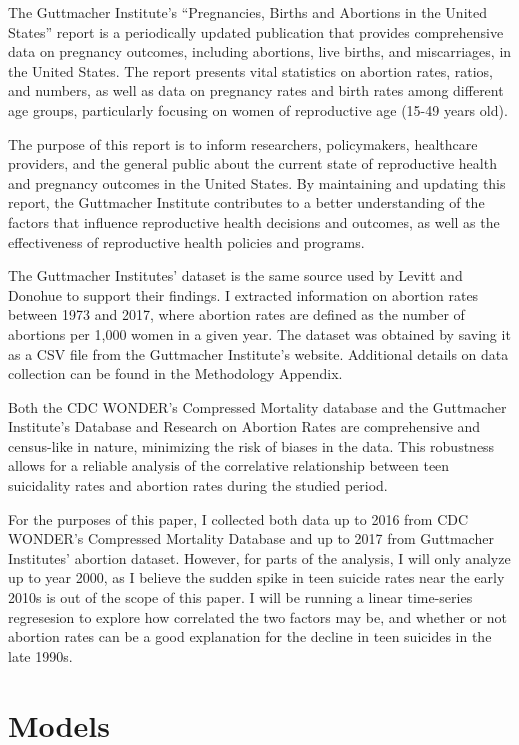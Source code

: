 \documentclass[
  letterpaper,
  DIV=11,
  numbers=noendperiod]{scrartcl}
\begin{document}
The Guttmacher Institute's ``Pregnancies, Births and Abortions in the
United States'' report is a periodically updated publication that
provides comprehensive data on pregnancy outcomes, including abortions,
live births, and miscarriages, in the United States. The report presents
vital statistics on abortion rates, ratios, and numbers, as well as data
on pregnancy rates and birth rates among different age groups,
particularly focusing on women of reproductive age (15-49 years old).

The purpose of this report is to inform researchers, policymakers,
healthcare providers, and the general public about the current state of
reproductive health and pregnancy outcomes in the United States. By
maintaining and updating this report, the Guttmacher Institute
contributes to a better understanding of the factors that influence
reproductive health decisions and outcomes, as well as the effectiveness
of reproductive health policies and programs.

The Guttmacher Institutes' dataset is the same source used by Levitt and
Donohue to support their findings. I extracted information on abortion
rates between 1973 and 2017, where abortion rates are defined as the
number of abortions per 1,000 women in a given year. The dataset was
obtained by saving it as a CSV file from the Guttmacher Institute's
website. Additional details on data collection can be found in the
Methodology Appendix.

Both the CDC WONDER's Compressed Mortality database and the Guttmacher
Institute's Database and Research on Abortion Rates are comprehensive
and census-like in nature, minimizing the risk of biases in the data.
This robustness allows for a reliable analysis of the correlative
relationship between teen suicidality rates and abortion rates during
the studied period.

For the purposes of this paper, I collected both data up to 2016 from
CDC WONDER's Compressed Mortality Database and up to 2017 from
Guttmacher Institutes' abortion dataset. However, for parts of the
analysis, I will only analyze up to year 2000, as I believe the sudden
spike in teen suicide rates near the early 2010s is out of the scope of
this paper. I will be running a linear time-series regresesion to
explore how correlated the two factors may be, and whether or not
abortion rates can be a good explanation for the decline in teen
suicides in the late 1990s.

\hypertarget{models}{%
\section{Models}\label{models}}
\end{document}
